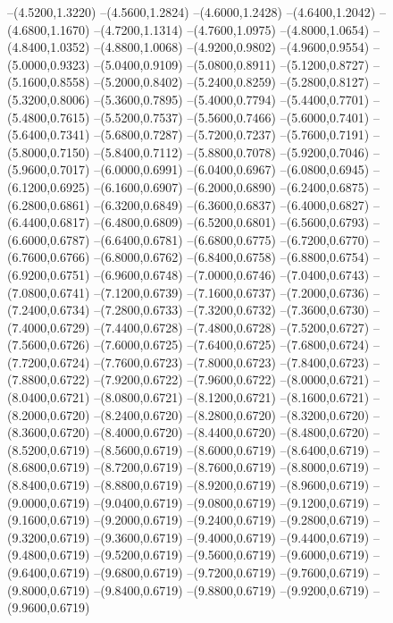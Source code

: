 {	--(4.5200,1.3220)
	--(4.5600,1.2824)
	--(4.6000,1.2428)
	--(4.6400,1.2042)
	--(4.6800,1.1670)
	--(4.7200,1.1314)
	--(4.7600,1.0975)
	--(4.8000,1.0654)
	--(4.8400,1.0352)
	--(4.8800,1.0068)
	--(4.9200,0.9802)
	--(4.9600,0.9554)
	--(5.0000,0.9323)
	--(5.0400,0.9109)
	--(5.0800,0.8911)
	--(5.1200,0.8727)
	--(5.1600,0.8558)
	--(5.2000,0.8402)
	--(5.2400,0.8259)
	--(5.2800,0.8127)
	--(5.3200,0.8006)
	--(5.3600,0.7895)
	--(5.4000,0.7794)
	--(5.4400,0.7701)
	--(5.4800,0.7615)
	--(5.5200,0.7537)
	--(5.5600,0.7466)
	--(5.6000,0.7401)
	--(5.6400,0.7341)
	--(5.6800,0.7287)
	--(5.7200,0.7237)
	--(5.7600,0.7191)
	--(5.8000,0.7150)
	--(5.8400,0.7112)
	--(5.8800,0.7078)
	--(5.9200,0.7046)
	--(5.9600,0.7017)
	--(6.0000,0.6991)
	--(6.0400,0.6967)
	--(6.0800,0.6945)
	--(6.1200,0.6925)
	--(6.1600,0.6907)
	--(6.2000,0.6890)
	--(6.2400,0.6875)
	--(6.2800,0.6861)
	--(6.3200,0.6849)
	--(6.3600,0.6837)
	--(6.4000,0.6827)
	--(6.4400,0.6817)
	--(6.4800,0.6809)
	--(6.5200,0.6801)
	--(6.5600,0.6793)
	--(6.6000,0.6787)
	--(6.6400,0.6781)
	--(6.6800,0.6775)
	--(6.7200,0.6770)
	--(6.7600,0.6766)
	--(6.8000,0.6762)
	--(6.8400,0.6758)
	--(6.8800,0.6754)
	--(6.9200,0.6751)
	--(6.9600,0.6748)
	--(7.0000,0.6746)
	--(7.0400,0.6743)
	--(7.0800,0.6741)
	--(7.1200,0.6739)
	--(7.1600,0.6737)
	--(7.2000,0.6736)
	--(7.2400,0.6734)
	--(7.2800,0.6733)
	--(7.3200,0.6732)
	--(7.3600,0.6730)
	--(7.4000,0.6729)
	--(7.4400,0.6728)
	--(7.4800,0.6728)
	--(7.5200,0.6727)
	--(7.5600,0.6726)
	--(7.6000,0.6725)
	--(7.6400,0.6725)
	--(7.6800,0.6724)
	--(7.7200,0.6724)
	--(7.7600,0.6723)
	--(7.8000,0.6723)
	--(7.8400,0.6723)
	--(7.8800,0.6722)
	--(7.9200,0.6722)
	--(7.9600,0.6722)
	--(8.0000,0.6721)
	--(8.0400,0.6721)
	--(8.0800,0.6721)
	--(8.1200,0.6721)
	--(8.1600,0.6721)
	--(8.2000,0.6720)
	--(8.2400,0.6720)
	--(8.2800,0.6720)
	--(8.3200,0.6720)
	--(8.3600,0.6720)
	--(8.4000,0.6720)
	--(8.4400,0.6720)
	--(8.4800,0.6720)
	--(8.5200,0.6719)
	--(8.5600,0.6719)
	--(8.6000,0.6719)
	--(8.6400,0.6719)
	--(8.6800,0.6719)
	--(8.7200,0.6719)
	--(8.7600,0.6719)
	--(8.8000,0.6719)
	--(8.8400,0.6719)
	--(8.8800,0.6719)
	--(8.9200,0.6719)
	--(8.9600,0.6719)
	--(9.0000,0.6719)
	--(9.0400,0.6719)
	--(9.0800,0.6719)
	--(9.1200,0.6719)
	--(9.1600,0.6719)
	--(9.2000,0.6719)
	--(9.2400,0.6719)
	--(9.2800,0.6719)
	--(9.3200,0.6719)
	--(9.3600,0.6719)
	--(9.4000,0.6719)
	--(9.4400,0.6719)
	--(9.4800,0.6719)
	--(9.5200,0.6719)
	--(9.5600,0.6719)
	--(9.6000,0.6719)
	--(9.6400,0.6719)
	--(9.6800,0.6719)
	--(9.7200,0.6719)
	--(9.7600,0.6719)
	--(9.8000,0.6719)
	--(9.8400,0.6719)
	--(9.8800,0.6719)
	--(9.9200,0.6719)
	--(9.9600,0.6719)
}
